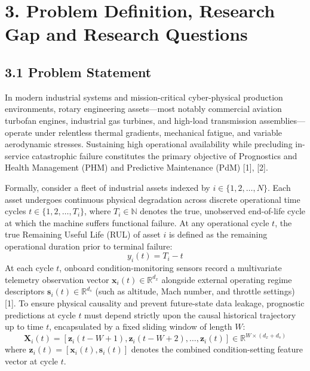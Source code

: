\documentclass[12pt,a4paper]{article}
\begin{document}
\section*{3. Problem Definition, Research Gap and Research Questions}

\subsection*{3.1 Problem Statement}
In modern industrial systems and mission-critical cyber-physical production environments, rotary engineering assets—most notably commercial aviation turbofan engines, industrial gas turbines, and high-load transmission assemblies—operate under relentless thermal gradients, mechanical fatigue, and variable aerodynamic stresses. Sustaining high operational availability while precluding in-service catastrophic failure constitutes the primary objective of Prognostics and Health Management (PHM) and Predictive Maintenance (PdM) [1], [2]. 

Formally, consider a fleet of industrial assets indexed by $i \in \{1, 2, \dots, N\}$. Each asset undergoes continuous physical degradation across discrete operational time cycles $t \in \{1, 2, \dots, T_i\}$, where $T_i \in \mathbb{N}$ denotes the true, unobserved end-of-life cycle at which the machine suffers functional failure. At any operational cycle $t$, the true Remaining Useful Life (RUL) of asset $i$ is defined as the remaining operational duration prior to terminal failure:
\begin{equation}
y_i(t) = T_i - t
\end{equation}
At each cycle $t$, onboard condition-monitoring sensors record a multivariate telemetry observation vector $\mathbf{x}_i(t) \in \mathbb{R}^{d_x}$ alongside external operating regime descriptors $\mathbf{s}_i(t) \in \mathbb{R}^{d_s}$ (such as altitude, Mach number, and throttle settings) [1]. To ensure physical causality and prevent future-state data leakage, prognostic predictions at cycle $t$ must depend strictly upon the causal historical trajectory up to time $t$, encapsulated by a fixed sliding window of length $W$:
\begin{equation}
\mathbf{X}_i(t) = [\mathbf{z}_i(t-W+1), \mathbf{z}_i(t-W+2), \dots, \mathbf{z}_i(t)] \in \mathbb{R}^{W \times (d_x + d_s)}
\end{equation}
where $\mathbf{z}_i(t) = [\mathbf{x}_i(t), \mathbf{s}_i(t)]$ denotes the combined condition-setting feature vector at cycle $t$.
\end{document}
